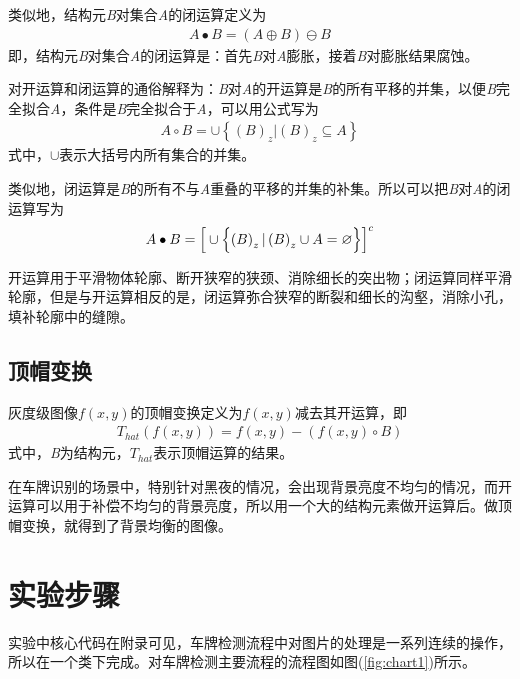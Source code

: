 \documentclass{hitreport}
\begin{document}
类似地，结构元\textit{B}对集合\textit{A}的闭运算定义为
\begin{align}
A \bullet B = \left(A \oplus B\right)\ominus B
\end{align}
即，结构元\textit{B}对集合\textit{A}的闭运算是：首先\textit{B}对\textit{A}膨胀，接着\textit{B}对膨胀结果腐蚀。

对开运算和闭运算的通俗解释为：\textit{B}对\textit{A}的开运算是\textit{B}的所有平移的并集，以便\textit{B}完全拟合\textit{A}，条件是\textit{B}完全拟合于\textit{A}，可以用公式写为
\begin{align}
A\circ B = \cup \left\{\left(B\right)_z | \left(B\right)_z\subseteq A\right\}
\end{align}
式中，$\cup$表示大括号内所有集合的并集。

类似地，闭运算是\textit{B}的所有不与\textit{A}重叠的平移的并集的补集。所以可以把\textit{B}对\textit{A}的闭运算写为
\begin{align}
A\bullet B = \Big[ \cup \Bigl\{\left(B\right)_z | \left(B\right)_z\cup A = \varnothing\Bigl\} \Big]^c
\end{align}

开运算用于平滑物体轮廓、断开狭窄的狭颈、消除细长的突出物；闭运算同样平滑轮廓，但是与开运算相反的是，闭运算弥合狭窄的断裂和细长的沟壑，消除小孔，填补轮廓中的缝隙。

\subsection{顶帽变换}\label{sec:hat}

灰度级图像$f\left(x,y\right)$的顶帽变换定义为$f\left(x,y\right)$减去其开运算，即
\begin{align}
T_{hat}\left(f\left(x,y\right)\right) = f\left(x,y\right) - \left(f\left(x,y\right) \circ B\right)
\end{align}
式中，\textit{B}为结构元，$T_{hat}$表示顶帽运算的结果。

在车牌识别的场景中，特别针对黑夜的情况，会出现背景亮度不均匀的情况，而开运算可以用于补偿不均匀的背景亮度，所以用一个大的结构元素做开运算后。做顶帽变换，就得到了背景均衡的图像。

\section{实验步骤}

实验中核心代码在附录可见，车牌检测流程中对图片的处理是一系列连续的操作，所以在一个类下完成。对车牌检测主要流程的流程图如图(\ref{fig:chart1})所示。
\end{document}
